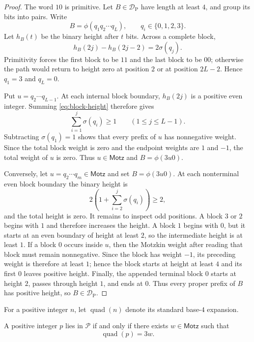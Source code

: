 \documentclass{ws-ijfcs}
\newcommand{\DP}{\mathcal{D}_{\mathrm{P}}}
\newcommand{\Pset}{\mathcal P}
\begin{document}
\begin{proof}
The word $10$ is primitive.  Let $B\in\DP$ have length at least $4$, and
group its bits into pairs.  Write
\[
 B=\phi(q_1q_2\cdots q_L),
 \qquad q_i\in\{0,1,2,3\}.
\]
Let $h_B(t)$ be the binary height after $t$ bits.  Across a complete block,
\begin{equation}\label{eq:block-height}
 h_B(2j)-h_B(2j-2)=2\sigma(q_j).
\end{equation}
Primitivity forces the first block to be $11$ and the last block to be
$00$; otherwise the path would return to height zero at position $2$ or
at position $2L-2$.  Hence $q_1=3$ and $q_L=0$.

Put $u=q_2\cdots q_{L-1}$.  At each internal block boundary,
$h_B(2j)$ is a positive even integer.  Summing
\eqref{eq:block-height} therefore gives
\[
 \sum_{i=1}^{j}\sigma(q_i)\geq1
 \qquad(1\leq j\leq L-1).
\]
Subtracting $\sigma(q_1)=1$ shows that every prefix of $u$ has
nonnegative weight.  Since the total block weight is zero and the endpoint
weights are $1$ and $-1$, the total weight of $u$ is zero.  Thus
$u\in\mathsf{Motz}$ and $B=\phi(3u0)$.

Conversely, let $u=q_2\cdots q_m\in\mathsf{Motz}$ and set
$B=\phi(3u0)$.  At each nonterminal even block boundary the binary height
is
\[
 2\left(1+\sum_{i=2}^{j}\sigma(q_i)\right)\geq2,
\]
and the total height is zero.  It remains to inspect odd positions.  A
block $3$ or $2$ begins with $1$ and therefore increases the height.  A
block $1$ begins with $0$, but it starts at an even boundary of height at
least $2$, so the intermediate height is at least $1$.  If a block $0$
occurs inside $u$, then the Motzkin weight after reading that block must
remain nonnegative.  Since the block has weight $-1$, its preceding weight
is therefore at least $1$; hence the block starts at height at least $4$
and its first $0$ leaves positive height.  Finally, the appended terminal block
$0$ starts at height $2$, passes through height $1$, and ends at $0$.
Thus every proper prefix of $B$ has positive height, so $B\in\DP$.
\end{proof}

For a positive integer $n$, let $\operatorname{quad}(n)$ denote its
standard base-$4$ expansion.

\begin{corollary}\label{cor:base4}
A positive integer $p$ lies in $\Pset$ if and only if there exists
$w\in\mathsf{Motz}$ such that
\begin{equation}\label{eq:base4-value-characterization}
 \operatorname{quad}(p)=3w.
\end{equation}
\end{corollary}
\end{document}

